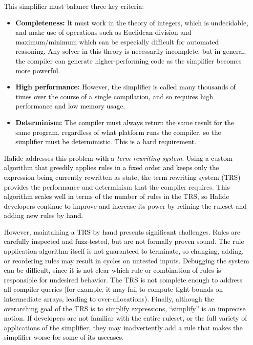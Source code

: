 \documentclass[acmsmall]{acmart}\settopmatter{}
\newcommand{\modified}[1]{\textcolor{black}{{#1}}}
\begin{document}
\modified{This simplifier must balance three key criteria:}

\begin{itemize}
  \item \modified{\textbf{Completeness:}
It must work in 
the theory of integers, which is undecidable, and make use of operations such as 
Euclidean division and maximum/minimum which can be especially difficult for 
automated reasoning. Any solver in this theory is necessarily incomplete, but in general, 
the compiler can generate higher-performing code as the simplifier becomes more powerful.}
  \item \modified{\textbf{High performance:} However, the simplifier is called many thousands of 
times over the course of a single compilation, and so requires high performance and low memory usage. }
  \item \modified{\textbf{Determinism:} The compiler must always return the same 
result for the same program, regardless of what platform runs the compiler, 
so the simplifier must be deterministic. This is a hard requirement.}
\end{itemize}


\modified{Halide addresses this problem with a \emph{term rewriting system}. Using a custom algorithm 
that greedily applies rules in a fixed order and keeps only the expression being currently 
rewritten as state, the term rewriting system (TRS) provides the performance and determinism 
that the compiler requires. This algorithm scales well in terms of the number of rules
in the TRS, so Halide developers continue to improve and increase its
power by refining the ruleset and adding new rules by hand.}

\modified{However, maintaining a TRS by hand presents significant challenges. Rules are 
carefully inspected and fuzz-tested, but are not formally proven sound. The 
rule application algorithm itself is not guaranteed to terminate, so changing, adding, or 
reordering rules may result in cycles on untested inputs. Debugging the system can be 
difficult, since it is not clear which rule or combination of rules is responsible for 
undesired behavior. The TRS is not complete enough to address all compiler queries 
(for example, it may fail to compute tight bounds on intermediate arrays, leading to over-allocations).
Finally, although the overarching goal of the TRS is to simplify 
expressions, ``simplify'' is an imprecise notion. If developers are not familiar with 
the entire ruleset, or the full variety of applications of the simplifier, they may inadvertently 
add a rule that makes the simplifier worse for some of its usecases. }
\end{document}
